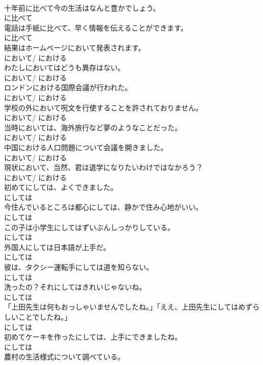 \documentclass[8pt]{extreport}
\begin{document}
\begin{CJK}{UTF8}{min}
\\	十年前に比べて今の生活はなんと豊かでしょう。	
\\	に比べて
\\	電話は手紙に比べて、早く情報を伝えることができます。	
\\	に比べて
\\	結果はホームページにおいて発表されます。	
\\	において/ における
\\	わたしにおいてはどうも異存はない。	
\\	において/ における
\\	ロンドンにおける国際会議が行われた。	
\\	において/ における
\\	学校の外において呪文を行使することを許されておりません。	
\\	において/ における
\\	当時においては、海外旅行など夢のようなことだった。	
\\	において/ における
\\	中国における人口問題について会議を開きました。	
\\	において/ における
\\	現状において、当然、君は退学になりたいわけではなかろう？	
\\	において/ における
\\	初めてにしては、よくできました。	
\\	にしては
\\	今住んでいるところは都心にしては、静かで住み心地がいい。	
\\	にしては
\\	この子は小学生にしてはずいぶんしっかりしている。	
\\	にしては
\\	外国人にしては日本語が上手だ。	
\\	にしては
\\	彼は、タクシー運転手にしては道を知らない。	
\\	にしては
\\	洗ったの？それにしてはきれいじゃないね。	
\\	にしては
\\	「上田先生は何もおっしゃいませんでしたね。」「ええ、上田先生にしてはめずらしいことでしたね。」	
\\	にしては
\\	初めてケーキを作ったにしては、上手にできましたね。	
\\	にしては
\\	農村の生活様式について調べている。	

\end{CJK}
\end{document}
